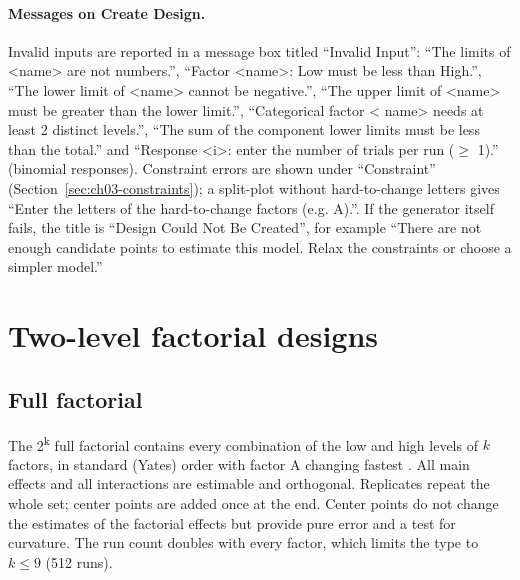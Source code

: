 \paragraph{Messages on Create Design.} Invalid inputs are reported in a message box titled ``Invalid Input'': ``The
limits of \textless name\textgreater{} are not numbers.'', ``Factor \textless name\textgreater: Low must be less
than High.'', ``The lower limit of \textless name\textgreater{} cannot be negative.'', ``The upper limit of
\textless name\textgreater{} must be greater than the lower limit.'', ``Categorical factor \textless
name\textgreater{} needs at least 2 distinct levels.'', ``The sum of the component lower limits must be less than
the total.'' and ``Response \textless i\textgreater: enter the number of trials per run ($\ge$ 1).'' (binomial
responses). Constraint errors are shown under ``Constraint'' (Section~\ref{sec:ch03-constraints}); a split-plot
without hard-to-change letters gives ``Enter the letters of the hard-to-change factors (e.g. A).''. If the
generator itself fails, the title is ``Design Could Not Be Created'', for example ``There are not enough candidate
points to estimate this model. Relax the constraints or choose a simpler model.''

\section{Two-level factorial designs}
\label{sec:ch03-factorial}

\subsection{Full factorial}
The 2\textsuperscript{k} full factorial contains every combination of the low and high levels of $k$ factors, in
standard (Yates) order with factor A changing fastest \citep{montgomery2017}. All main effects and all interactions
are estimable and orthogonal. Replicates repeat the whole set; center points are added once at the end. Center
points do not change the estimates of the factorial effects but provide pure error and a test for curvature. The
run count doubles with every factor, which limits the type to $k \le 9$ (512 runs).

